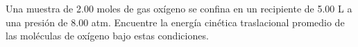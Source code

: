 \item Una muestra de 2.00 moles de gas oxígeno se confina en un recipiente de 5.00 L a una presión de 8.00 atm. Encuentre la energía cinética traslacional promedio de las moléculas de oxígeno bajo estas condiciones.
